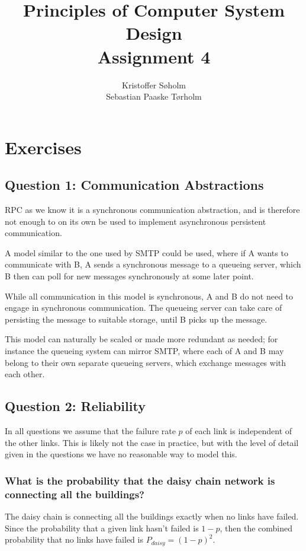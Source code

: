 \documentclass[11pt,a4paper]{article}
\title{Principles of Computer System Design\\Assignment 4}
\author{Kristoffer Søholm\\Sebastian Paaske Tørholm}
\begin{document}
\maketitle

\section*{Exercises}
\subsection*{Question 1: Communication Abstractions}

RPC as we know it is a synchronous communication abstraction, and is therefore
not enough to on its own be used to implement asynchronous persistent
communication.

A model similar to the one used by SMTP could be used, where if A wants to
communicate with B, A sends a synchronous message to a queueing server, which
B then can poll for new messages synchronously at some later point.

While all communication in this model is synchronous, A and B do not need to
engage in synchronous communication. The queueing server can take care of
persisting the message to suitable storage, until B picks up the message.

This model can naturally be scaled or made more redundant as needed; for
instance the queueing system can mirror SMTP, where each of A and B may belong
to their own separate queueing servers, which exchange messages with each
other.

\subsection*{Question 2: Reliability} 
In all questions we assume that the failure rate $p$ of each link is
independent of the other links. This is likely not the case in practice, but
with the level of detail given in the questions we have no reasonable way to
model this.

\subsubsection*{What is the probability that the daisy chain network is
                connecting all the buildings?}

The daisy chain is connecting all the buildings exactly when no links have
failed. Since the probability that a given link hasn't failed is $1-p$, then
the combined probability that no links have failed is $P_{daisy} = (1-p)^2$.
\end{document}
